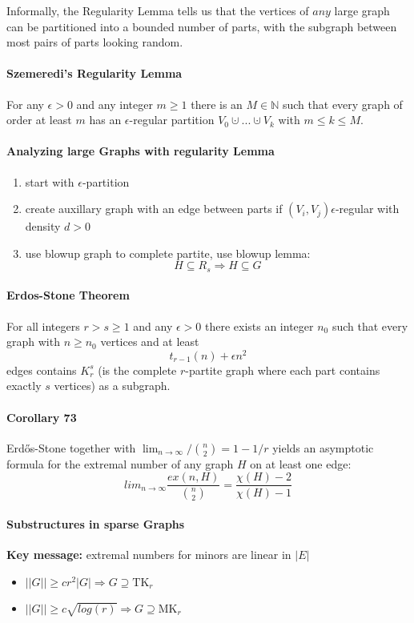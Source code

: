 \bigskip \noindent
Informally, the Regularity Lemma tells us that the vertices of $ any $ large 
graph can be partitioned into a bounded number of parts, with the subgraph 
between most pairs of parts looking random.

\paragraph{Szemeredi's Regularity Lemma} For any $\epsilon > 0 $ and any 
integer $ m \geq 1 $ there is an $ M \in \mathbb{N} $ such that every graph 
of order at least $ m $ has an $\epsilon$-regular partition 
$V_0 \cupdot...\cupdot V_k$ with $ m\leq k \leq M $.

\paragraph{Analyzing large Graphs with regularity Lemma}
\begin{enumerate}
    \item start with $\epsilon$-partition
    \item create auxillary graph with an edge between parts 
    if $(V_i,V_j) \epsilon$-regular with density $d > 0$
    \item use blowup graph to complete partite, use blowup lemma:
    $$ H \subseteq R_s \Rightarrow H \subseteq G $$
\end{enumerate}

\paragraph{Erdos-Stone Theorem} For all integers $ r > s \geq 1 $ and any 
$ \epsilon > 0 $ there exists an integer $ n_0 $ such that every graph with 
$n \geq n_0$ vertices and at least
$$ t_{r-1}(n) + \epsilon n^2 $$
edges contains $ K^s_r $ (is the complete $r$-partite graph where each 
part contains exactly $ s $ vertices) as a subgraph.

\paragraph{Corollary 73} Erd\H{o}s-Stone together with 
$ \lim_{n\to\infty} / \binom{n}{2} = 1 - 1 / r $ yields an asymptotic formula 
for the extremal number of any graph $ H $ on at least one edge:
$$ lim_{n\to\infty} \frac{ex(n,H)}{\binom{n}{2}} 
= \frac{\chi(H)-2}{\chi(H)-1} $$

\paragraph{Substructures in sparse Graphs}
\textbf{Key message:} extremal numbers for minors are linear in $|E|$
\begin{itemize}
    \item $||G|| \geq cr^2|G| \Rightarrow G \supseteq \text{TK}_r $
    \item $||G|| \geq c\sqrt{log(r)} \Rightarrow G \supseteq \text{MK}_r $
\end{itemize}
